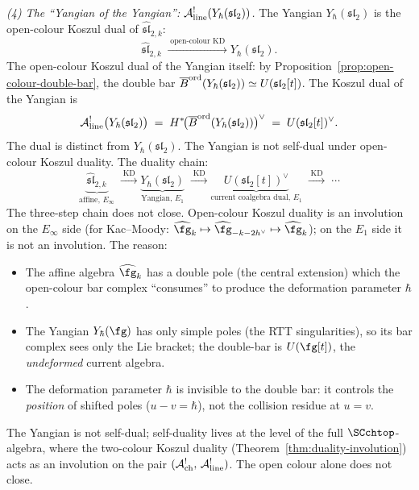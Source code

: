 \begin{computation}
\medskip
\noindent\emph{(4) The ``Yangian of the Yangian'':
$\mathcal{A}^!_{\mathrm{line}}(Y_\hbar(\mathfrak{sl}_2))$.}
The Yangian $Y_\hbar(\mathfrak{sl}_2)$ is the open-colour Koszul
dual of $\widehat{\mathfrak{sl}}_{2,k}$:
\[
\widehat{\mathfrak{sl}}_{2,k}
\;\xrightarrow{\;\text{open-colour KD}\;}
Y_\hbar(\mathfrak{sl}_2).
\]
The open-colour Koszul dual of the Yangian itself: by
Proposition~\ref{prop:open-colour-double-bar}, the double bar
$\overline{B}^{\mathrm{ord}}(Y_\hbar(\mathfrak{sl}_2))
\simeq U(\mathfrak{sl}_2[t])$.
The Koszul dual of the Yangian is
\begin{equation}\label{eq:yangian-koszul-dual}
\mathcal{A}^!_{\mathrm{line}}\bigl(Y_\hbar(\mathfrak{sl}_2)\bigr)
\;=\;
H^*\!\bigl(\overline{B}^{\mathrm{ord}}(Y_\hbar(\mathfrak{sl}_2))
\bigr)^\vee
\;=\;
U(\mathfrak{sl}_2[t])^\vee.
\end{equation}
The dual is distinct from $Y_\hbar(\mathfrak{sl}_2)$. The Yangian
is not self-dual under open-colour Koszul duality. The duality
chain:
\[
\underbrace{\widehat{\mathfrak{sl}}_{2,k}}_{
\text{affine, }E_\infty}
\;\xrightarrow{\;\text{KD}\;}
\underbrace{Y_\hbar(\mathfrak{sl}_2)}_{
\text{Yangian, }E_1}
\;\xrightarrow{\;\text{KD}\;}
\underbrace{U(\mathfrak{sl}_2[t])^\vee}_{
\text{current coalgebra dual, }E_1}
\;\xrightarrow{\;\text{KD}\;}
\;\cdots
\]
The three-step chain does not close. Open-colour Koszul duality is
an involution on the $E_\infty$ side (for Kac--Moody:
$\widehat{\fg}_k \mapsto \widehat{\fg}_{-k-2h^\vee} \mapsto
\widehat{\fg}_k$); on the $E_1$ side it is not an involution. The
reason:
\begin{itemize}[nosep]
\item The affine algebra $\widehat{\fg}_k$ has a
 double pole (the central extension) which the
 open-colour bar complex ``consumes'' to produce the
 deformation parameter $\hbar$.
\item The Yangian $Y_\hbar(\fg)$ has only simple poles
 (the RTT singularities), so its bar complex sees only
 the Lie bracket; the double-bar is
 $U(\fg[t])$, the \emph{undeformed} current algebra.
\item The deformation parameter $\hbar$ is invisible
 to the double bar: it controls the \emph{position}
 of shifted poles ($u{-}v = \hbar$), not the collision
 residue at $u = v$.
\end{itemize}
The Yangian is not self-dual; self-duality lives at the level of
the full $\SCchtop$-algebra, where the two-colour Koszul duality
(Theorem~\ref{thm:duality-involution}) acts as an involution on
the pair $(\mathcal{A}^!_{\mathrm{ch}},\,\mathcal{A}^!_{\mathrm{line}})$. The open
colour alone does not close.


\end{computation}
